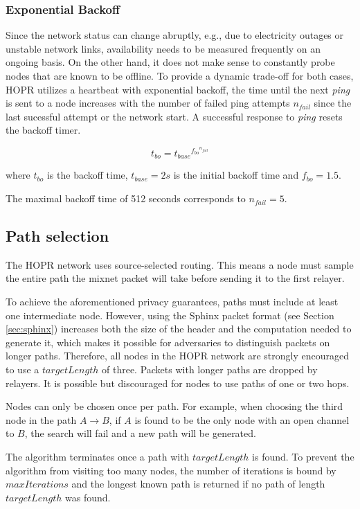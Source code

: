 \subsubsection{Exponential Backoff}
Since the network status can change abruptly, e.g., due to electricity outages or unstable network links, availability needs to be measured frequently on an ongoing basis. On the other hand, it does not make sense to constantly probe nodes that are known to be offline. To provide a dynamic trade-off for both cases, HOPR utilizes a heartbeat with exponential backoff, the time until the next \textit{ping} is sent to a node increases with the number of failed ping attempts $n_{fail}$ since the last sucessful attempt or the network start. A successful response to \textit{ping} resets the backoff timer.

$$ t_{bo} = {t_{base}}^{{f_{bo}}^{n_{fail}}} $$

where $t_{bo}$ is the backoff time, $t_{base} = 2s$ is the initial backoff time and $f_{bo} = 1.5$.

The maximal backoff time of 512 seconds corresponds to $n_{fail} = 5$.



\subsection{Path selection}
\label{sec:path-selection:graph-traversal}

The HOPR network uses source-selected routing. This means a node must sample the entire path the mixnet packet will take before sending it to the first relayer.

To achieve the aforementioned privacy guarantees, paths must include at least one intermediate node. However, using the Sphinx packet format (see Section \ref{sec:sphinx}) increases both the size of the header and the computation needed to generate it, which makes it possible for adversaries to distinguish packets on longer paths. Therefore, all nodes in the HOPR network are strongly encouraged to use a $targetLength$ of three. Packets with longer paths are dropped by relayers. It is possible but discouraged for nodes to use paths of one or two hops.

Nodes can only be chosen once per path. For example, when choosing the third node in the path $A\rightarrow B$, if $A$ is found to be the only node with an open channel to $B$, the search will fail and a new path will be generated.

The algorithm terminates once a path with $targetLength$ is found. To prevent the algorithm from visiting too many nodes, the number of iterations is bound by $maxIterations$ and the longest known path is returned if no path of length $targetLength$ was found.

